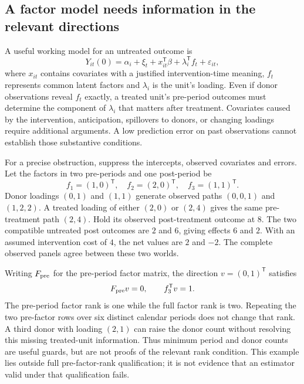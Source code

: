 \subsection{A factor model needs information in the relevant directions}
\label{exec21:gsynth-rank}

A useful working model for an untreated outcome is
\begin{equation}
\label{exec21:gsynth-factor}
 Y_{it}(0)=\alpha_i+\xi_t+x_{it}^{\mathsf T}\beta
                     +\lambda_i^{\mathsf T}f_t+\varepsilon_{it},
\end{equation}
where $x_{it}$ contains covariates with a justified intervention-time meaning,
$f_t$ represents common latent factors and $\lambda_i$ is the unit's loading.
Even if donor observations reveal $f_t$ exactly, a treated unit's pre-period
outcomes must determine the component of $\lambda_i$ that matters after
treatment. Covariates caused by the intervention, anticipation, spillovers
to donors, or changing loadings require additional arguments. A low prediction
error on past observations cannot establish those substantive conditions.

For a precise obstruction, suppress the intercepts, observed covariates and
errors. Let the factors in two pre-periods and one post-period be
\begin{equation}
\label{exec21:gsynth-witness}
 f_1=(1,0)^{\mathsf T},\quad f_2=(2,0)^{\mathsf T},\quad
 f_3=(1,1)^{\mathsf T}.
\end{equation}
Donor loadings $(0,1)$ and $(1,1)$ generate observed paths $(0,0,1)$ and
$(1,2,2)$. A treated loading of either $(2,0)$ or $(2,4)$ gives the same
pre-treatment path $(2,4)$. Hold its observed post-treatment outcome at $8$.
The two compatible untreated post outcomes are $2$ and $6$, giving effects
$6$ and $2$. With an assumed intervention cost of $4$, the net values are $2$
and $-2$. The complete observed panels agree between these two worlds.
\cite{exec21_gsynth_reference}

Writing $F_{\rm pre}$ for the pre-period factor matrix, the direction
$v=(0,1)^{\mathsf T}$ satisfies
\begin{equation}
\label{exec21:gsynth-null}
 F_{\rm pre}v=0,\qquad f_3^{\mathsf T}v=1.
\end{equation}
The pre-period factor rank is one while the full factor rank is two.
Repeating the two pre-factor rows over six distinct calendar periods does
not change that rank. A third donor with loading $(2,1)$ can raise the donor
count without resolving this missing treated-unit information. Thus minimum
period and donor counts are useful guards, but are not proofs of the relevant
rank condition. This example lies outside full pre-factor-rank qualification;
it is not evidence that an estimator valid under that qualification fails.
\cite{exec21_gsynth_reference}

